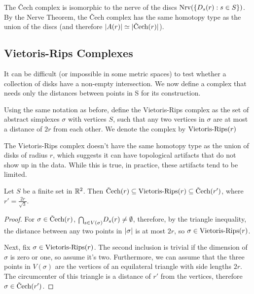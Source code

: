 The \v{C}ech complex is isomorphic to the nerve of the discs $\textrm{Nrv}(\{D_s(r): s \in S\})$. By the Nerve Theorem, the \v{C}ech complex has the same homotopy type as the union of the discs (and therefore $\abs{A(r)} \simeq \abs{\cech(r)}$).

\subsection{Vietoris-Rips Complexes}

It can be difficult (or impossible in some metric spaces) to test whether a collection of disks have a non-empty intersection. We now define a complex that needs only the distances between points in S for its construction.

\begin{definition}
Using the same notation as before, define the Vietoris-Rips complex as the set of abstract simplexes $\sigma$ with vertices $S$, such that any two vertices in $\sigma$ are at most a distance of $2r$ from each other. We denote the complex by $\textrm{Vietoris-Rips}(r)$
\end{definition}

The Vietoris-Rips complex doesn't have the same homotopy type as the union of disks of radius $r$, which suggests it can have topological artifacts that do not show up in the data. While this is true, in practice, these artifacts tend to be limited.

\begin{proposition}
Let $S$ be a finite set in $\mathbb{R}^2$. Then $\cech(r) \subseteq \rips(r) \subseteq \cech(r')$, where $r' = \frac {2r}{\sqrt{3}}$.
\end{proposition}

\begin{proof}
For $\sigma \in \cech(r)$, $\mathsmaller{\bigcap}_{s \in V(\sigma)} D_s(r) \not = \emptyset$, therefore, by the triangle inequality, the distance between any two points in $\lvert\sigma\rvert$ is at most $2r$, so $\sigma \in \textrm{Vietoris-Rips}(r)$.

Next, fix $\sigma \in \textrm{Vietoris-Rips}(r)$. The second inclusion is trivial if the dimension of $\sigma$ is zero or one, so assume it's two. Furthermore, we can assume that the three points in $V(\sigma)$ are the vertices of an equilateral triangle with side lengths $2r$. The circumcenter of this triangle is a distance of $r'$ from the vertices, therefore $\sigma \in \cech(r')$.
\end{proof}

